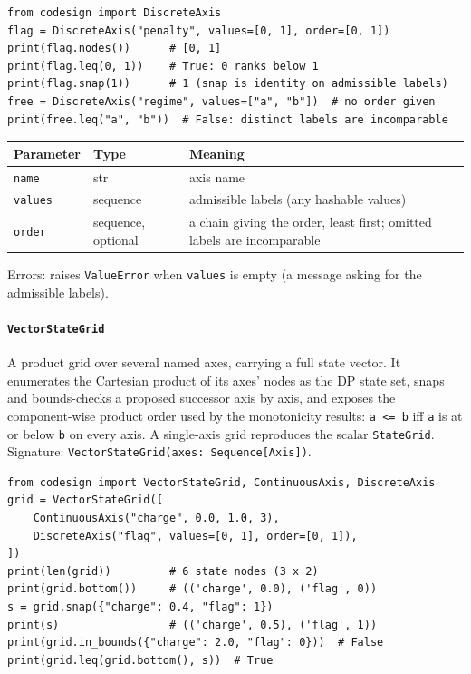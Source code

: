 \documentclass[11pt,a4paper]{article}
\begin{document}
\begin{lstlisting}
from codesign import DiscreteAxis
flag = DiscreteAxis("penalty", values=[0, 1], order=[0, 1])
print(flag.nodes())      # [0, 1]
print(flag.leq(0, 1))    # True: 0 ranks below 1
print(flag.snap(1))      # 1 (snap is identity on admissible labels)
free = DiscreteAxis("regime", values=["a", "b"])  # no order given
print(free.leq("a", "b"))  # False: distinct labels are incomparable
\end{lstlisting}

\begin{center}
\begin{tabular}{@{}llp{}@{}}
\toprule
Parameter & Type & Meaning \\
\midrule
\texttt{name} & str & axis name \\
\texttt{values} & sequence & admissible labels (any hashable values) \\
\texttt{order} & sequence, optional & a chain giving the order, least
  first; omitted labels are incomparable \\
\bottomrule
\end{tabular}
\end{center}
Errors: raises \texttt{ValueError} when \texttt{values} is empty (a message
asking for the admissible labels).

\paragraph{\texttt{VectorStateGrid}}\label{ref:state:vectorstategrid}
A product grid over several named axes, carrying a full state vector. It
enumerates the Cartesian product of its axes' nodes as the DP state set,
snaps and bounds-checks a proposed successor axis by axis, and exposes the
component-wise product order used by the monotonicity results:
\texttt{a <= b} iff \texttt{a} is at or below \texttt{b} on every axis. A
single-axis grid reproduces the scalar \texttt{StateGrid}.
Signature: \texttt{VectorStateGrid(axes: Sequence[Axis])}.

\begin{lstlisting}
from codesign import VectorStateGrid, ContinuousAxis, DiscreteAxis
grid = VectorStateGrid([
    ContinuousAxis("charge", 0.0, 1.0, 3),
    DiscreteAxis("flag", values=[0, 1], order=[0, 1]),
])
print(len(grid))         # 6 state nodes (3 x 2)
print(grid.bottom())     # (('charge', 0.0), ('flag', 0))
s = grid.snap({"charge": 0.4, "flag": 1})
print(s)                 # (('charge', 0.5), ('flag', 1))
print(grid.in_bounds({"charge": 2.0, "flag": 0}))  # False
print(grid.leq(grid.bottom(), s))  # True
\end{lstlisting}
\end{document}

